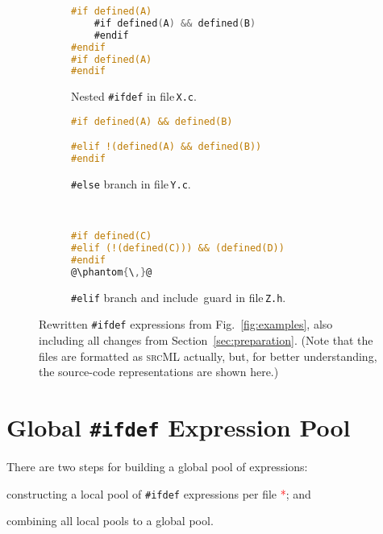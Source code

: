 \documentclass[a4paper]{scrartcl}
\newcommand\code[1]{\texttt{#1}}
\newcommand\tool[1]{\textsc{#1}}
\newcommand\ifdeff[1]{\code{\##1}\xspace}
\newcommand\ifdef[0]{{\upshape\ifdeff{ifdef}}\xspace}
\newcommand\affected{\textcolor{red}{*}\xspace}
\begin{document}
\begin{figure}[ht]
        \centering
        \begin{subfigure}[t]{\textwidth}
					\begin{lstlisting}[language=C]
#if defined(A)
	#if defined(A) && defined(B)
	#endif
#endif
#if defined(A)
#endif
					\end{lstlisting}
					\caption{Nested \ifdef in file\,\code{X.c}.\vspace{1em}}
					\label{fig:examples2:a}
        \end{subfigure}
        \vspace{1em}
        \begin{subfigure}[t]{\textwidth}
					\begin{lstlisting}[language=C, firstnumber=5]
#if defined(A) && defined(B)

#elif !(defined(A) && defined(B))
#endif
					\end{lstlisting}
					\caption{\ifdeff{else} branch in file\,\code{Y.c}.}
					\label{fig:examples2:b}
        \end{subfigure}
        \begin{subfigure}[t]{\textwidth}
					\begin{lstlisting}[language=C, firstnumber=8]


#if defined(C)
#elif (!(defined(C))) && (defined(D))
#endif
@\phantom{\,}@
					\end{lstlisting}
					\caption{\ifdeff{elif} branch and include~guard in file\,\code{Z.h}.}
					\label{fig:examples2:c}
        \end{subfigure}
        
        \caption{Rewritten \ifdef expressions from Fig.\ \ref{fig:examples}, also including all changes from Section~\ref{sec:preparation}.
        				{\footnotesize (Note that the files are formatted as \tool{srcML} actually, but, for better understanding, the source-code representations are shown here.)}}
        \label{fig:examples2}
\end{figure}



\section{Global \ifdef Expression Pool}
\label{sec:pool}

There are two steps for building a global pool of expressions:
\begin{inparaenum}[\itshape 1\upshape)]
\item constructing a local pool of \ifdef expressions per file \affected; and
\item combining all local pools to a global pool.
\end{inparaenum}
\end{document}
